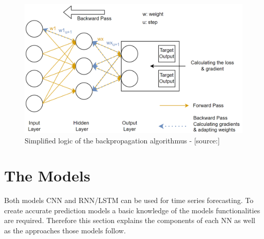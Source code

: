 \begin{figure}[H]
	\centering
		\includegraphics[width=14cm]{images/bp}
	\caption{Simplified logic of the backpropagation algorithmus - [source:\cite{bp_basic}]}
	\label{fig:bp}
\end{figure}
\section{The Models}
Both models CNN and RNN/LSTM can be used for time series forecasting. To create accurate prediction models a basic knowledge of the models functionalities are required. Therefore this section explains the components of each NN as well as the approaches those models follow. 

